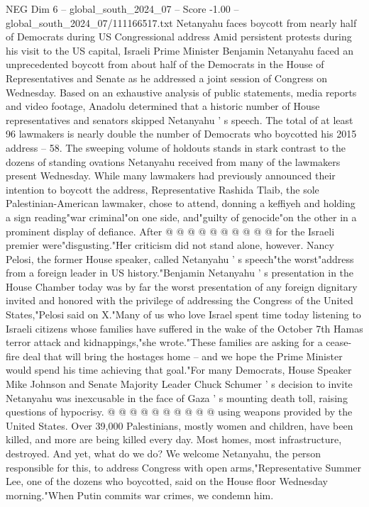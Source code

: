 \begin{textsample}{NEG Dim 6 – global\_south\_2024\_07 – Score -1.00 – global\_south\_2024\_07/111166517.txt}  \label{ex:f6_neg_126}
Netanyahu faces boycott from nearly half of Democrats during US Congressional address Amid persistent protests during his visit to the US capital, Israeli Prime Minister Benjamin Netanyahu faced an unprecedented boycott from about half of the Democrats in the House of Representatives and Senate as he addressed a joint session of Congress on Wednesday.
Based on an exhaustive analysis of public statements, media reports and video footage, Anadolu determined that a historic number of House representatives and senators skipped Netanyahu ' s speech.
The total of at least 96 lawmakers is nearly double the number of Democrats who boycotted his 2015 address -- 58.
The sweeping volume of holdouts stands in stark contrast to the dozens of standing ovations Netanyahu received from many of the lawmakers present Wednesday.
While many lawmakers had previously announced their intention to boycott the address, Representative Rashida Tlaib, the sole Palestinian-American lawmaker, chose to attend, donning a keffiyeh and holding a sign reading"war criminal"on one side, and"guilty of genocide"on the other in a prominent display of defiance.
After @ @ @ @ @ @ @ @ @ @ for the Israeli premier were"disgusting."Her criticism did not stand alone, however.
Nancy Pelosi, the former House speaker, called Netanyahu ' s speech"the worst"address from a foreign leader in US history."Benjamin Netanyahu ' s presentation in the House Chamber today was by far the worst presentation of any foreign dignitary invited and honored with the privilege of addressing the Congress of the United States,"Pelosi said on X."Many of us who love Israel spent time today listening to Israeli citizens whose families have suffered in the wake of the October 7th Hamas terror attack and kidnappings,"she wrote."These families are asking for a cease-fire deal that will bring the hostages home -- and we hope the Prime Minister would spend his time achieving that goal."For many Democrats, House Speaker Mike Johnson and Senate Majority Leader Chuck Schumer ' s decision to invite Netanyahu was inexcusable in the face of Gaza ' s mounting death toll, raising questions of hypocrisy. @ @ @ @ @ @ @ @ @ @ using weapons provided by the United States.
Over 39,000 Palestinians, mostly women and children, have been killed, and more are being killed every day.
Most homes, most infrastructure, destroyed.
And yet, what do we do?
We welcome Netanyahu, the person responsible for this, to address Congress with open arms,"Representative Summer Lee, one of the dozens who boycotted, said on the House floor Wednesday morning."When Putin commits war crimes, we condemn him.

\end{textsample}
